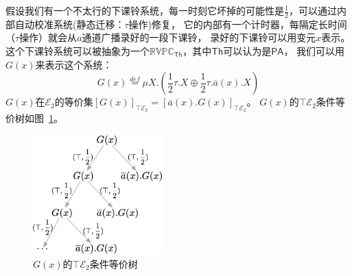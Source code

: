 \begin{example}\label{eg:1}
      假设我们有一个不太行的下课铃系统，每一时刻它坏掉的可能性是$\frac{1}{2}$，可以通过内部自动校准系统(静态迁移：$\tau$操作)修复，
      它的内部有一个计时器，每隔定长时间（$\tau$操作）就会从$a$通道广播录好的一段下课铃，
      录好的下课铃可以用变元$x$表示。
      这个下课铃系统可以被抽象为一个$\mathbb{RVPC}_{\mathsf{Th}}$，其中$\mathsf{Th}$可以认为是$\mathsf{PA}$\cite{PA}，
      我们可以用$G(x)$来表示这个系统：
      \begin{equation}
         G(x)\stackrel{def}{=}\mu X.(\frac{1}{2}\tau.X\oplus \frac{1}{2}\tau.\overline{a}(x).X)
      \end{equation}
      $G(x)$在$\mathcal{E}_2$的等价集$[G(x)]_{\top\mathcal{E}_2} = [\overline{a}(x).G(x)]_{\top\mathcal{E}_2}$。
      $G(x)$的$\top \mathcal{E}_2$条件等价树如图~\ref{fig_eg1}。
      \begin{figure}[!htbp]
         \small
         \centering
         \includegraphics[width=5cm]{../figures/example1.png}
         \caption[]{$G(x)$的$\top \mathcal{E}_2$条件等价树} 
         \label{fig_eg1}
      \end{figure}
\end{example}
